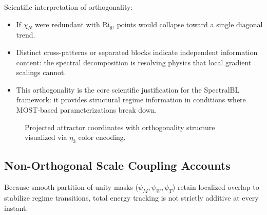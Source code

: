 \documentclass[11pt,a4paper]{article}
\begin{document}
Scientific interpretation of orthogonality:
\begin{itemize}
    \item If $\chi_N$ were redundant with $\mathrm{Ri}_g$, points would collapse toward a single diagonal trend.
    \item Distinct cross-patterns or separated blocks indicate independent information content: the spectral decomposition is resolving physics that local gradient scalings cannot.
    \item This orthogonality is the core scientific justification for the SpectralBL framework: it provides structural regime information in conditions where MOST-based parameterizations break down.
\end{itemize}

\begin{figure}[htbp]
    \centering
    \caption{Projected attractor coordinates with orthogonality structure visualized via $\eta_3$ color encoding.}
    \label{fig:spectral_orthogonality_gabls3}
\end{figure}

\subsection{Non-Orthogonal Scale Coupling Accounts}

Because smooth partition-of-unity masks ($\psi_M,\psi_W,\psi_T$) retain localized overlap to stabilize regime transitions, total energy tracking is not strictly additive at every instant.
\end{document}
